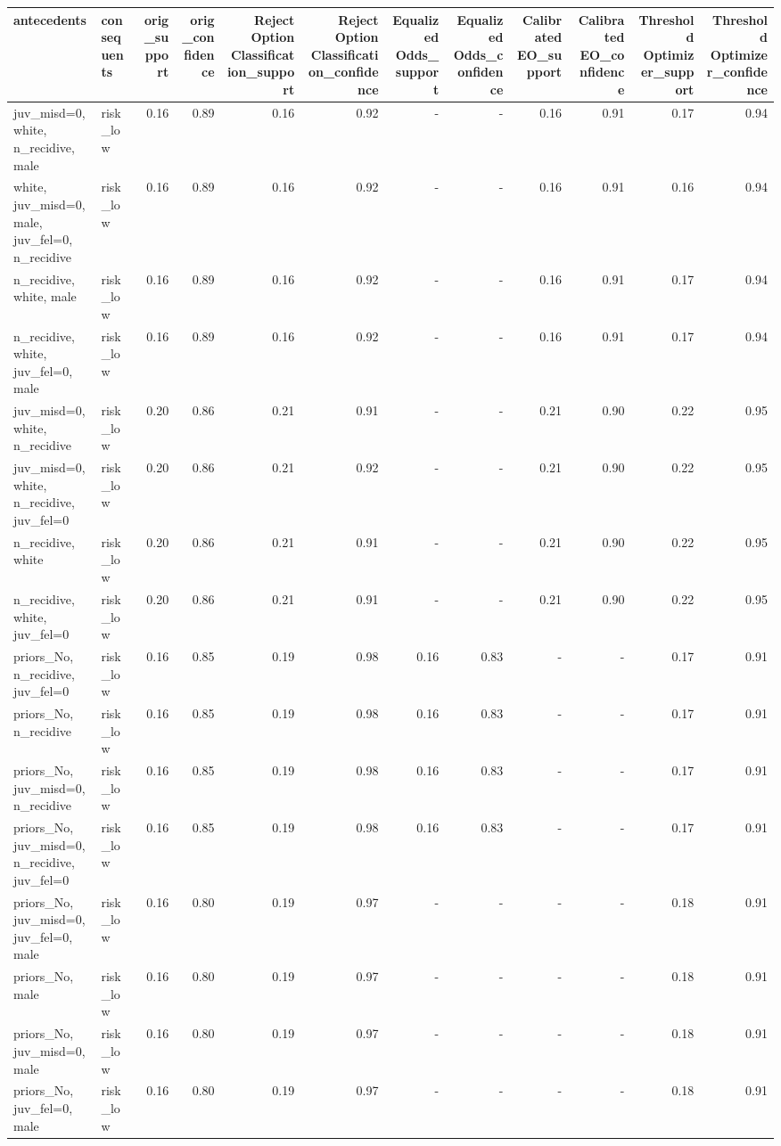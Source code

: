 \begin{tabular}{llrrrrrrrrrr}
\toprule
antecedents & consequents & orig\_support & orig\_confidence & Reject Option Classification\_support & Reject Option Classification\_confidence & Equalized Odds\_support & Equalized Odds\_confidence & Calibrated EO\_support & Calibrated EO\_confidence & Threshold Optimizer\_support & Threshold Optimizer\_confidence \\
\midrule
juv\_misd=0, white, n\_recidive, male & risk\_low & 0.16 & 0.89 & 0.16 & 0.92 & - & - & 0.16 & 0.91 & 0.17 & 0.94 \\
white, juv\_misd=0, male, juv\_fel=0, n\_recidive & risk\_low & 0.16 & 0.89 & 0.16 & 0.92 & - & - & 0.16 & 0.91 & 0.16 & 0.94 \\
n\_recidive, white, male & risk\_low & 0.16 & 0.89 & 0.16 & 0.92 & - & - & 0.16 & 0.91 & 0.17 & 0.94 \\
n\_recidive, white, juv\_fel=0, male & risk\_low & 0.16 & 0.89 & 0.16 & 0.92 & - & - & 0.16 & 0.91 & 0.17 & 0.94 \\
juv\_misd=0, white, n\_recidive & risk\_low & 0.20 & 0.86 & 0.21 & 0.91 & - & - & 0.21 & 0.90 & 0.22 & 0.95 \\
juv\_misd=0, white, n\_recidive, juv\_fel=0 & risk\_low & 0.20 & 0.86 & 0.21 & 0.92 & - & - & 0.21 & 0.90 & 0.22 & 0.95 \\
n\_recidive, white & risk\_low & 0.20 & 0.86 & 0.21 & 0.91 & - & - & 0.21 & 0.90 & 0.22 & 0.95 \\
n\_recidive, white, juv\_fel=0 & risk\_low & 0.20 & 0.86 & 0.21 & 0.91 & - & - & 0.21 & 0.90 & 0.22 & 0.95 \\
priors\_No, n\_recidive, juv\_fel=0 & risk\_low & 0.16 & 0.85 & 0.19 & 0.98 & 0.16 & 0.83 & - & - & 0.17 & 0.91 \\
priors\_No, n\_recidive & risk\_low & 0.16 & 0.85 & 0.19 & 0.98 & 0.16 & 0.83 & - & - & 0.17 & 0.91 \\
priors\_No, juv\_misd=0, n\_recidive & risk\_low & 0.16 & 0.85 & 0.19 & 0.98 & 0.16 & 0.83 & - & - & 0.17 & 0.91 \\
priors\_No, juv\_misd=0, n\_recidive, juv\_fel=0 & risk\_low & 0.16 & 0.85 & 0.19 & 0.98 & 0.16 & 0.83 & - & - & 0.17 & 0.91 \\
priors\_No, juv\_misd=0, juv\_fel=0, male & risk\_low & 0.16 & 0.80 & 0.19 & 0.97 & - & - & - & - & 0.18 & 0.91 \\
priors\_No, male & risk\_low & 0.16 & 0.80 & 0.19 & 0.97 & - & - & - & - & 0.18 & 0.91 \\
priors\_No, juv\_misd=0, male & risk\_low & 0.16 & 0.80 & 0.19 & 0.97 & - & - & - & - & 0.18 & 0.91 \\
priors\_No, juv\_fel=0, male & risk\_low & 0.16 & 0.80 & 0.19 & 0.97 & - & - & - & - & 0.18 & 0.91 \\
\bottomrule
\end{tabular}
